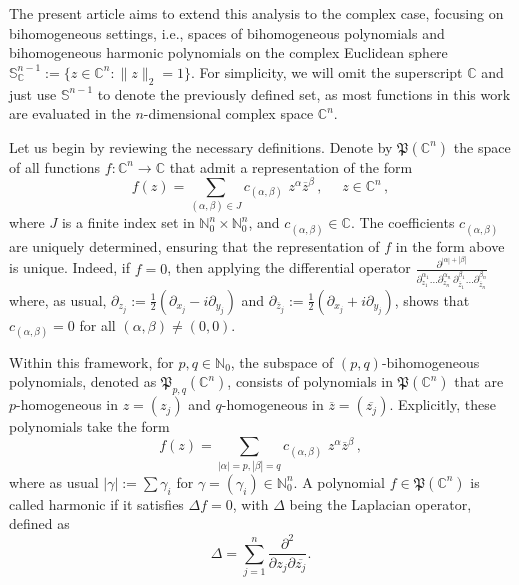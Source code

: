 \documentclass[12pt]{amsart}
\numberwithin{subsection}{section}
\theoremstyle{definition}
\theoremstyle{remark}
\begin{document}
The present article aims to extend this analysis to the complex case, focusing on bihomogeneous settings, i.e., spaces of bihomogeneous polynomials and bihomogeneous harmonic polynomials on the complex Euclidean  sphere  $\mathbb{S}^{n-1}_{\mathbb{C}}:= \{z \in \mathbb{C}^n : \|z\|_2 = 1\} $. For simplicity, we will omit the superscript  ${\mathbb{C}} $ and just use  $\mathbb{S}^{n-1} $ to denote the previously defined set, as most functions in this work are evaluated in the  $n $-dimensional complex space  $\mathbb{C}^n $.



Let us begin by reviewing the necessary definitions. Denote by  $\mathfrak{P}(\mathbb{C}^n) $ the space of all functions  $f\colon \mathbb{C}^n \to \mathbb{C} $ that admit a representation of the form
\begin{equation} \label{writtenf}
f(z) = \sum_{(\alpha,\beta) \in J} c_{(\alpha,\beta)}\,\,z^\alpha\overline{z}^\beta\,,\quad \,\,z \in \mathbb{C}^n\,,
\end{equation}
where  $J $ is a finite index set in  $\mathbb{N}_0^{n} \times \mathbb{N}_0^{n} $, and  $c_{(\alpha,\beta)} \in \mathbb{C} $. The coefficients  $c_{(\alpha,\beta)} $ are uniquely determined, ensuring that the representation of  $f $ in the form above is unique. Indeed, if  $f = 0 $, then applying the differential operator
 $
\frac{\partial^{|\alpha|+|\beta|}}{\partial_{z_1}^{\alpha_1}\ldots \partial_{z_n}^{\alpha_n}\,\partial_{\overline{z}_{1}}^{\beta_1}\ldots \partial_{\overline{z}_{n}}^{\beta_n}}
 $
where, as usual,  $\partial_{z_{j}} := \frac{1}{2}(\partial_{x_{j}}-i\partial_{y_{j}}) $ and  $\partial_{\overline{z}_{j}} := \frac{1}{2}(\partial_{x_{j}}+i\partial_{y_{j}}) $, shows that  $c_{(\alpha,\beta)} = 0 $ for all  $(\alpha, \beta) \neq (0,0) $.

Within this framework, for $p, q\in \mathbb{N}_0$, the subspace of  $(p,q) $-bihomogeneous
polynomials, denoted as  $\mathfrak{P}_{p,q}(\mathbb{C}^n) $, consists of polynomials in  $\mathfrak{P}(\mathbb{C}^n) $ that are
$p $-homogeneous in  $z = (z_j) $ and  $q $-homogeneous in  $\overline{z} = (\overline{z_j}) $. Explicitly, these polynomials take the
form
\begin{equation} \label{(p,q)-writing}
f(z) = \sum_{|\alpha|=p, |\beta|=q} c_{(\alpha,\beta)}\,\,z^\alpha\overline{z}^\beta\,,
\end{equation}
where as usual  $|\gamma|:=\sum \gamma_i $
for  $\gamma = (\gamma_i)\in \mathbb{N}^n_0 $.
A polynomial $ f \in \mathfrak{P}(\mathbb{C}^n) $ is called harmonic if it satisfies $ \Delta f = 0 $, with $ \Delta $ being the
Laplacian
operator, defined as
\[
\Delta = \sum_{j=1}^n \frac{\partial^2}{\partial z_j \partial \overline{z_j}}.
\]
\end{document}
